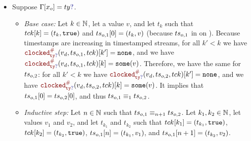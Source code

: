 \begin{skippableproof}
\begin{itemize}
\begin{itemize}
                        Because timestamps are increasing in timestamped streams, for all
                        $k_1 < k' < k_2$ we have $\clocked{ty}{v_d}{\ts_{o, 1}}{\tck}[k']$ that
                        equals $\clocked{ty}{v_d}{\ts_{o, 1}}{\tck}[k_1]$,
                        and we have $\clocked{ty}{v_d}{\ts_{o, 1}}{\tck}[k_2] = v_2$.
                        Therefore, we have the same for $\ts_{o, 2}$: for all $k_1 < k' < k_2$ we
                        have $\clocked{ty}{v_d}{\ts_{o, 2}}{\tck}[k']$ that
                        equals $\clocked{ty}{v_d}{\ts_{o, 2}}{\tck}[k_1]$,
                        and we have $\clocked{ty}{v_d}{\ts_{o, 2}}{\tck}[k_2] = v_2$.
                        Timestamped streams for signals only contain their updates, which implies
                        that $\ts_{o, 2}[n+1] = (t_{k_2}, v_2) = \ts_{o, 1}[n+1]$, and thus
                        $\ts_{o, 1} \equiv_{n+1} \ts_{o, 2}$.
              \end{itemize}
        \item Suppose $\tyCtx[x_o] = \mayB{ty}$.
              \begin{itemize}
                  \item \textit{Base case:} Let $k \in \mathbb{N}$, let a value $v$, and let $t_k$ such that
                        $tck[k] = (t_k, \mathtt{{true}})$ and $ts_{o, 1}[0] = (t_k, v)$ (because
                        $ts_{o, 1}$ in on \tck). Because timestamps are increasing in timestamped
                        streams, for all $k' < k$ we have $\clocked{\mayB{ty}}{v_d}{\ts_{o, 1}}{\tck}[k'] = \none$,
                        and we have $\clocked{\mayB{ty}}{v_d}{\ts_{o, 1}}{\tck}[k] = \some{v}$.
                        Therefore, we have the same for $\ts_{o, 2}$: for all $k' < k$ we have
                        $\clocked{\mayB{ty}}{v_d}{\ts_{o, 2}}{\tck}[k'] = \none$, and we have
                        $\clocked{\mayB{ty}}{v_d}{\ts_{o, 2}}{\tck}[k] = \some{v}$.
                        It implies that $ts_{o, 1}[0] = ts_{o, 2}[0]$, and thus $ts_{o, 1} \equiv_1 ts_{o, 2}$.

                  \item \textit{Inductive step:} Let $n \in \mathbb{N}$ such that
                        $\ts_{o, 1} \equiv_{n+1} \ts_{o, 2}$. Let $k_1, k_2 \in \mathbb{N}$, let values
                        $v_1$ and $v_2$, and let $t_{k_1}$ and $t_{k_2}$ such that
                        $tck[k_1] = (t_{k_1}, \mathtt{{true}})$, $tck[k_2] = (t_{k_2}, \mathtt{{true}})$,
                        $ts_{o, 1}[n] = (t_{k_1}, v_1)$, and $ts_{o, 1}[n+1] = (t_{k_2}, v_2)$.


\end{itemize}
\end{itemize}
\end{skippableproof}
